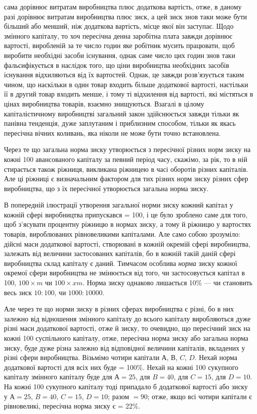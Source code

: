 \parcont{}  %
сама дорівнює витратам виробництва плюс додаткова вартість,
отже, в даному разі дорівнює витратам виробництва плюс зиск,
а цей зиск знов таки може бути більший або менший, ніж додаткова вартість, місце якої він заступає.
Щодо змінного капіталу, то хоч пересічна денна заробітна плата завжди дорівнює вартості, виробленій
за те число годин яке робітник
мусить працювати, щоб виробити необхідні засоби існування,
однак саме число цих годин знов таки фальсифікується в наслідок того, що ціни виробництва необхідних
засобів існування
відхиляються від їх вартостей. Однак, це завжди розв’язується
таким чином, що наскільки в один товар входить більше додаткової вартості, настільки її в другий
товар входить менше,
і тому ті відхилення від вартості, які містяться в цінах виробництва товарів, взаємно знищуються.
Взагалі в цілому капіталістичному виробництві загальний закон здійснюється завжди
тільки як панівна тенденція, дуже заплутаним і приблизним
способом, тільки як якась пересічна вічних коливань, яка ніколи
не може бути точно встановлена.

Через те що загальна норма зиску утворюється з пересічної
різних норм зиску на кожні 100 авансованого капіталу за певний
період часу, скажімо, за рік, то в ній стирається також ріжниця,
викликана ріжницею в часі оборотів різних капіталів. Але ці
ріжниці є визначальним фактором для тих різних норм зиску
різних сфер виробництва, що з їх пересічної утворюється загальна норма зиску.

В попередній ілюстрації утворення загальної норми зиску
кожний капітал у кожній сфері виробництва припускався = 100,
і це було зроблено саме для того, щоб з’ясувати процентну
ріжницю в нормах зиску, а тому й ріжницю у вартостях товарів,
вироблюваних рівновеликими капіталами. Але само собою зрозуміло: дійсні маси додаткової вартості,
створювані в кожній
окремій сфері виробництва, залежать від величини застосованих
капіталів, бо в кожній такій даній сфері виробництва склад капіталу є даний. Тимчасом особлива \emph{норма}
зиску кожної окремої
сфери виробництва не змінюється від того, чи застосовується
капітал в 100, $100 × m$ чи $100 × xm$. Норма зиску однаково лишається 10\% — чи становить весь зиск $10 :
100$, чи $1000 : 10000$.

Але через те що норми зиску в різних сферах виробництва
є різні, бо в них залежно від відношення змінного капіталу до
всього капіталу виробляються дуже різні маси додаткової вартості, отже й зиску, то очевидно, що
пересічний зиск на кожні
100 суспільного капіталу, отже, пересічна норма зиску або загальна норма зиску, буде дуже різна
залежно від відповідної
величини капіталів, вкладених у різні сфери виробництва. Візьмімо чотири капітали $А$, $В$, $C$, $D$. Нехай
норма додаткової вартості для всіх них буде = 100\%. Нехай на кожні 100 сукупного
капіталу змінного капіталу буде для $А = 25$, для $B = 40$, для
$C = 15$, для $D = 10$. На кожні 100 сукупного капіталу тоді припадало
б додаткової вартості або зиску у $А = 25$, $B = 40$, $C = 15$, $D = 10$; разом $= 90$; отже, якщо всі
чотири капітали є рівновеликі, пересічна норма зиску є  = 22\%.

